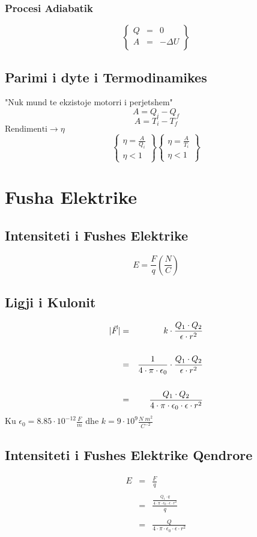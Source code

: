 \documentclass[a4paper, twocolumn]{article}
\DeclarePairedDelimiter\abs{\lvert}{\rvert}
\begin{document}
\subsubsection{Procesi Adiabatik}
\[
\begin{Bmatrix}
Q&=&0\\
A&=&-\Delta U\\
\end{Bmatrix}
\]
\subsection{Parimi i dyte i Termodinamikes}
"Nuk mund te ekzistoje motorri i perjetshem"
\[
A=Q_{i}-Q_{f}
\] 
\[
A=T_{i}-T_{f}
\]
$ \text{Rendimenti} \to \eta $
\[
\begin{Bmatrix}
	\eta = \frac{A}{Q_{i}}\\
	\eta < 1
\end{Bmatrix}
\begin{Bmatrix}
	\eta = \frac{A}{T_{i}}\\
	\eta < 1
\end{Bmatrix}
\] 
\section{Fusha Elektrike}
\subsection{Intensiteti i Fushes Elektrike}
\[
	E=\frac{F}{q} \left( \frac{N}{C} \right)
\] 
\subsection{Ligji i Kulonit}
\begin{eqnarray*}
\abs{\vec{F}}&=&k\cdot \frac{Q_{1}\cdot Q_{2}}{\epsilon \cdot r^2}\\
\\
&=&\frac{1}{4\cdot \pi \cdot \epsilon _{0}} \cdot \frac{Q_{1}\cdot Q_{2}}{\epsilon \cdot r^2}\\
\\
&=&\frac{Q_{1}\cdot Q_{2}}{4\cdot \pi \cdot \epsilon _{0}\cdot \epsilon \cdot r^2}\\
\end{eqnarray*}
Ku $\epsilon _{0} = 8.85\cdot 10^{-12} \frac{F}{m}$ dhe $k=9\cdot 10^9 \frac{N \; m^2}{C^{-2}}$
\subsection{Intensiteti i Fushes Elektrike Qendrore}
\begin{eqnarray*}
	E&=& \frac{F}{q} \\
	\\
	 &= & \frac{\frac{Q_{1}\cdot q}{4\cdot \pi \cdot \epsilon _{0}\cdot \epsilon \cdot r^2} }{q} \\
	 \\
	 &= & \frac{Q}{4\cdot \pi \cdot \epsilon _{0}\cdot \epsilon \cdot r^2} \\
\end{eqnarray*}
\end{document}
